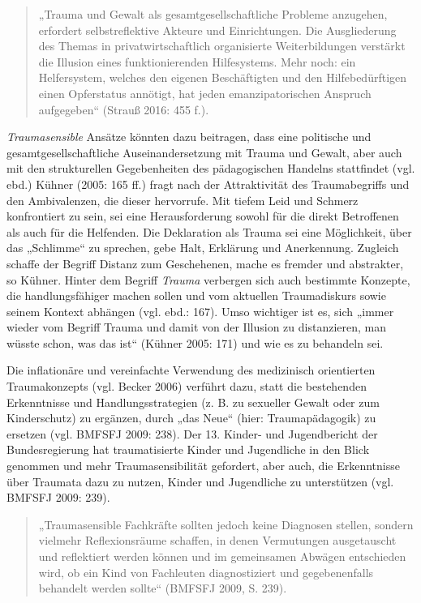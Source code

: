 \begin{quote}
\small{„Trauma und Gewalt als gesamtgesellschaftliche Probleme anzugehen, erfordert selbstreflektive Akteure und Einrichtungen. Die Ausgliederung des Themas in privatwirtschaftlich organisierte Weiterbildungen verstärkt die Illusion eines funktionierenden Hilfesystems. Mehr noch: ein Helfersystem, welches den eigenen Beschäftigten und den Hilfebedürftigen einen Opferstatus annötigt, hat jeden emanzipatorischen Anspruch aufgegeben“ (Strauß 2016: 455 f.).}
\end{quote}

\textit{Traumasensible} Ansätze könnten dazu beitragen, dass eine politische und gesamtgesellschaftliche Auseinandersetzung mit Trauma und Gewalt, aber auch mit den strukturellen Gegebenheiten des pädagogischen Handelns stattfindet (vgl. ebd.) Kühner (2005: 165 ff.) fragt nach der Attraktivität des Traumabegriffs und den Ambivalenzen, die dieser hervorrufe. Mit tiefem Leid und Schmerz konfrontiert zu sein, sei eine Herausforderung sowohl für die direkt Betroffenen als auch für die Helfenden. Die Deklaration als Trauma sei eine Möglichkeit, über das „Schlimme“ zu sprechen, gebe Halt, Erklärung und Anerkennung. Zugleich schaffe der Begriff Distanz zum Geschehenen, mache es fremder und abstrakter, so Kühner. Hinter dem Begriff \textit{Trauma} verbergen sich auch bestimmte Konzepte, die handlungsfähiger machen sollen und vom aktuellen Traumadiskurs sowie seinem Kontext abhängen (vgl. ebd.: 167). Umso wichtiger ist es, sich „immer wieder vom Begriff Trauma und damit von der Illusion zu distanzieren, man wüsste schon, was das ist“ (Kühner 2005: 171) und wie es zu behandeln sei.

Die inflationäre und vereinfachte Verwendung des medizinisch orientierten Traumakonzepts (vgl. Becker 2006) verführt dazu, statt die bestehenden Erkenntnisse und Handlungsstrategien (z. B. zu sexueller Gewalt oder zum Kinderschutz) zu ergänzen, durch „das Neue“ (hier: Traumapädagogik) zu ersetzen (vgl. BMFSFJ 2009: 238). Der 13. Kinder- und Jugendbericht der Bundesregierung hat traumatisierte Kinder und Jugendliche in den Blick genommen und mehr Traumasensibilität gefordert, aber auch, die Erkenntnisse über Traumata dazu zu nutzen, Kinder und Jugendliche zu unterstützen (vgl. BMFSFJ 2009: 239).

\begin{quote}
\small{„Traumasensible Fachkräfte sollten jedoch keine Diagnosen stellen, sondern vielmehr Reflexionsräume schaffen, in denen Vermutungen ausgetauscht und reflektiert werden können und im gemeinsamen Abwägen entschieden wird, ob ein Kind von Fachleuten diagnostiziert und gegebenenfalls behandelt werden sollte“ (BMFSFJ 2009, S. 239).}
\end{quote}

